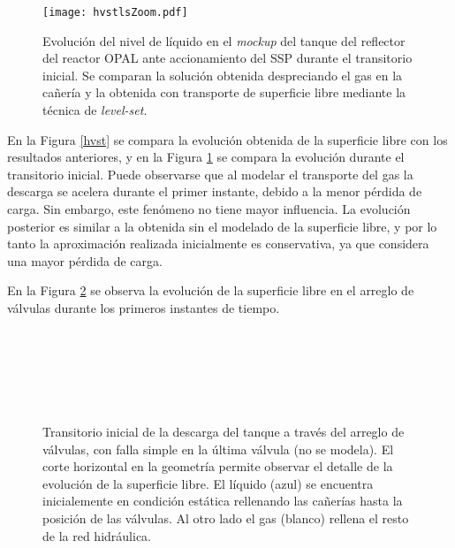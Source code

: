 \begin{figure}[ht]
\centering
\texttt{[image: hvstlsZoom.pdf]}
\caption[Evolución del nivel de líquido en el \textit{mockup} del tanque del reflector del reactor OPAL ante accionamiento del SSP]
{Evolución del nivel de líquido en el \textit{mockup} del tanque del reflector del reactor OPAL ante accionamiento del SSP durante el transitorio inicial.
  Se comparan la solución obtenida despreciando el gas en la cañería y la obtenida con transporte de superficie libre mediante la técnica de \textit{level-set}.}  
	\label{hvstls}
\end{figure}

En la Figura \ref{hvst} se compara la evolución obtenida de la superficie libre con los resultados anteriores,
y en la Figura \ref{hvstls} se compara la evolución durante el transitorio inicial.
Puede observarse que al modelar el transporte del gas la descarga se acelera durante el primer instante, debido a la menor pérdida de carga.
Sin embargo, este fenómeno no tiene mayor influencia.
La evolución posterior es similar a la obtenida sin el modelado de la superficie libre,
y por lo tanto la aproximación realizada inicialmente es conservativa, ya que considera una mayor pérdida de carga.

En la Figura \ref{evol-ls} se observa la evolución de la superficie libre en el arreglo de válvulas durante los primeros instantes de tiempo.

\begin{figure}[ht]
\begin{minipage}{.5\linewidth}
\centering
{}\\
\\
\end{minipage}\hfill
\begin{minipage}{.5\linewidth}
\centering
{}\\
\\
\end{minipage}
\caption[Transitorio inicial de la descarga del tanque a través del arreglo de válvulas del \textit{mockup} del reactor OPAL, con detalle de la evolución de la superficie libre]
{Transitorio inicial de la descarga del tanque a través del arreglo de válvulas, con falla simple en la última válvula
  (no se modela).
	El corte horizontal en la geometría permite observar el detalle de la evolución de la superficie libre.
  El líquido (azul) se encuentra inicialemente en condición estática rellenando las cañerías hasta la posición de las válvulas.
  Al otro lado el gas (blanco) rellena el resto de la red hidráulica.}  
\label{evol-ls}
\end{figure}

